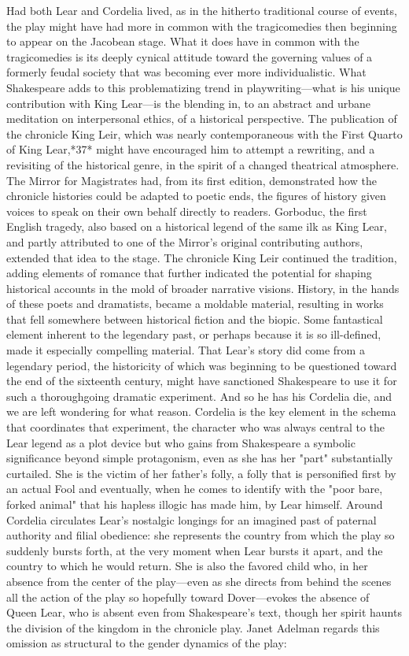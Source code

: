 	Had both Lear and Cordelia lived, as in the hitherto traditional course of events, the play might have had more in common with the tragicomedies then beginning to appear on the Jacobean stage. What it does have in common with the tragicomedies is its deeply cynical attitude toward the governing values of a formerly feudal society that was becoming ever more individualistic. What Shakespeare adds to this problematizing trend in playwriting—what is his unique contribution with King Lear—is the blending in, to an abstract and urbane meditation on interpersonal ethics, of a historical perspective. The publication of the chronicle King Leir, which was nearly contemporaneous with the First Quarto of King Lear,*37* might have encouraged him to attempt a rewriting, and a revisiting of the historical genre, in the spirit of a changed theatrical atmosphere. The Mirror for Magistrates had, from its first edition, demonstrated how the chronicle histories could be adapted to poetic ends, the figures of history given voices to speak on their own behalf directly to readers. Gorboduc, the first English tragedy, also based on a historical legend of the same ilk as King Lear, and partly attributed to one of the Mirror's original contributing authors, extended that idea to the stage. The chronicle King Leir continued the tradition, adding elements of romance that further indicated the potential for shaping historical accounts in the mold of broader narrative visions. History, in the hands of these poets and dramatists, became a moldable material, resulting in works that fell somewhere between historical fiction and the biopic. Some fantastical element inherent to the legendary past, or perhaps because it is so ill-defined, made it especially compelling material. That Lear's story did come from a legendary period, the historicity of which was beginning to be questioned toward the end of the sixteenth century, might have sanctioned Shakespeare to use it for such a thoroughgoing dramatic experiment. And so he has his Cordelia die, and we are left wondering for what reason.
	Cordelia is the key element in the schema that coordinates that experiment, the character who was always central to the Lear legend as a plot device but who gains from Shakespeare a symbolic significance beyond simple protagonism, even as she has her "part" substantially curtailed. She is the victim of her father's folly, a folly that is personified first by an actual Fool and eventually, when he comes to identify with the "poor bare, forked animal" that his hapless illogic has made him, by Lear himself. Around Cordelia circulates Lear's nostalgic longings for an imagined past of paternal authority and filial obedience: she represents the country from which the play so suddenly bursts forth, at the very moment when Lear bursts it apart, and the country to which he would return. She is also the favored child who, in her absence from the center of the play—even as she directs from behind the scenes all the action of the play so hopefully toward Dover—evokes the absence of Queen Lear, who is absent even from Shakespeare's text, though her spirit haunts the division of the kingdom in the chronicle play. Janet Adelman regards this omission as structural to the gender dynamics of the play:
